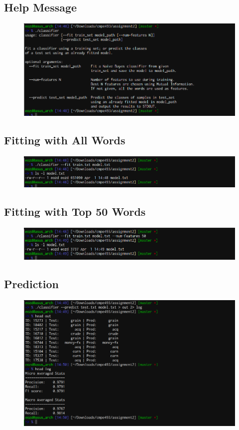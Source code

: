 \documentclass{article}
\begin{document}
\subsection{Help Message}
\begin{figure}[H]
	\centering
	\includegraphics[width=\textwidth]{help.png}
\end{figure}

\subsection{Fitting with All Words}
\begin{figure}[H]
	\centering
	\includegraphics[width=\textwidth]{fit_all.png}
\end{figure}

\subsection{Fitting with Top 50 Words}
\begin{figure}[H]
	\centering
	\includegraphics[width=\textwidth]{fit_50.png}
\end{figure}

\subsection{Prediction}
\begin{figure}[H]
	\centering
	\includegraphics[width=\textwidth]{predict.png}
\end{figure}
\end{document}

